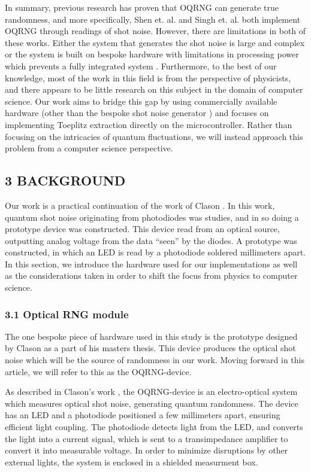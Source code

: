 In summary, previous research has proven that OQRNG can generate true randomness, and more specifically, Shen et. al. \cite{contender1} and Singh et. al. \cite{singh} both implement OQRNG through readings of shot noise. However, there are limitations in both of these works. Either the system that generates the shot noise is large and complex \cite{contender1} or the system is built on bespoke hardware with limitations in processing power which prevents a fully integrated system \cite{singh}. Furthermore, to the best of our knowledge, most of the work in this field is from the perspective of physicists, and there appears to be little research on this subject in the domain of computer science. Our work aims to bridge this gap by using commercially available hardware (other than the bespoke shot noise generator \cite{Clason2023}) and focuses on implementing Toeplitz extraction directly on the microcontroller. Rather than focusing on the intricacies of quantum fluctuations, we will instead approach this problem from a computer science perspective.

\subsection{3 BACKGROUND}\label{background}

Our work is a practical continuation of the work of Clason \cite{Clason2023}. In this work, quantum shot noise originating from photodiodes was studies, and in so doing a prototype device was constructed. This device read from an optical source, outputting analog voltage from the data ``seen'' by the diodes. A prototype was constructed, in which an LED is read by a photodiode soldered millimeters apart. In this section, we introduce the hardware used for our implementations as well as the considerations taken in order to shift the focus from physics to computer science.

\subsubsection{3.1 Optical RNG module}\label{optical-rng-module}

The one bespoke piece of hardware used in this study is the prototype designed by Clason \cite{Clason2023} as a part of his masters thesis. This device produces the optical shot noise which will be the source of randomness in our work. Moving forward in this article, we will refer to this as the OQRNG-device.

As described in Clason's work \cite{Clason2023}, the OQRNG-device is an electro-optical system which measures optical shot noise, generating quantum randomness. The device has an LED and a photodiode positioned a few millimeters apart, ensuring efficient light coupling. The photodiode detects light from the LED, and converts the light into a current signal, which is sent to a transimpedance amplifier to convert it into measurable voltage. In order to minimize disruptions by other external lights, the system is enclosed in a shielded measurment box.

